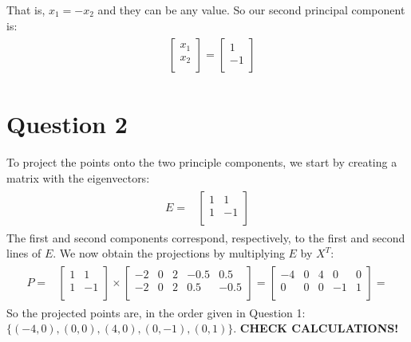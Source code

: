 \documentclass[leqno]{article}
\begin{document}
That is, $x_1 = -x_2$ and they can be any value. So our second principal component is:
\begin{gather*}
\begin{split}
&\begin{bmatrix}
    x_1 \\
    x_2  \\
\end{bmatrix} =
\begin{bmatrix} 
   1\\
   -1\\
\end{bmatrix}
\end{split}
\end{gather*}

\section*{Question 2} To project the points onto the two principle components, we start by creating a matrix with the eigenvectors: 
\begin{gather*}
\begin{split}
E =
&\begin{bmatrix}
    1 & 1 \\
    1 & -1\\
\end{bmatrix}
\end{split}
\end{gather*}
The first and second components correspond, respectively, to the first and second lines of $E$. We now obtain the projections by 
multiplying $E$ by $X^T$:
\begin{gather*}
\begin{split}
P =
&\begin{bmatrix}
    1 & 1 \\
    1 & -1\\
\end{bmatrix} \times
\begin{bmatrix} 
   -2 & 0 & 2 & -0.5 & 0.5\\
   -2 & 0 & 2 & 0.5 & -0.5\\
\end{bmatrix} =
\begin{bmatrix} 
   -4 & 0 & 4 & 0 & 0\\
   0 & 0 & 0 & -1 & 1\\
\end{bmatrix} =
\end{split}
\end{gather*}
So the projected points are, in the order given in Question 1: $\{(-4, 0), (0, 0), (4, 0), (0, -1), (0, 1)\}$.
\textbf{CHECK CALCULATIONS!}
\end{document}

